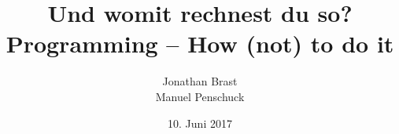 \documentclass[aspectratio=169]{beamer}
\begin{document}
\title{
	Und womit rechnest du so? \\[-0.5em]
	\textcolor{dunkelgrau}{\small Programming -- How (not) to do it}
}
\author{
	Jonathan Brast\\
	Manuel Penschuck \\
} 
\date{10. Juni 2017}

{
\goethccBgTitel
\begin{frame}
  \titlepage
\end{frame}
}
\addtocounter{framenumber}{-1}




\end{document}
